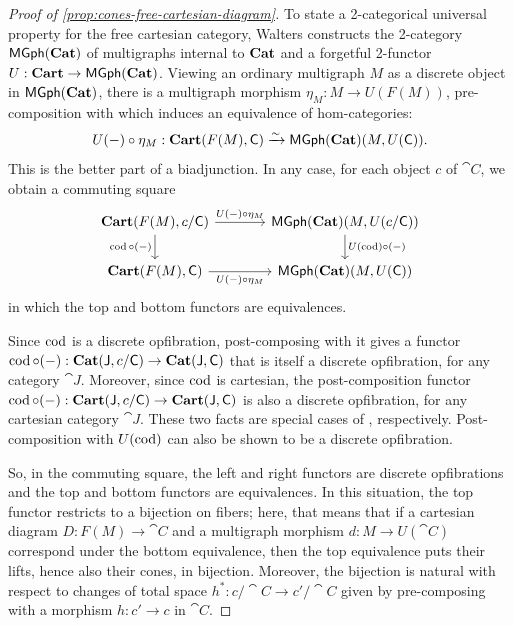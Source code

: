 \documentclass[11pt]{article}
\numberwithin{equation}{section}
\begin{document}
\begin{proof}[Proof of \cref{prop:cones-free-cartesian-diagram}]
  To state a 2-categorical universal property for the free cartesian category,
  Walters \cite{walters1989} constructs the 2-category $\mathsf{MGph}(\mathbf{Cat})$ of
  multigraphs internal to $\mathbf{Cat}$ and a forgetful 2-functor
  $U: \mathbf{Cart} \to \mathsf{MGph}(\mathbf{Cat})$. Viewing an ordinary multigraph $M$ as a discrete
  object in $\mathsf{MGph}(\mathbf{Cat})$, there is a multigraph morphism $\eta_M: M \to U(F(M))$,
  pre-composition with which induces an equivalence of hom-categories:
  \begin{equation*}
    U(-) \circ \eta_M: \mathbf{Cart}(F(M), \mathsf{C})
      \xrightarrow{\sim} \mathsf{MGph}(\mathbf{Cat})(M, U(\mathsf{C})).
  \end{equation*}
  This is the better part of a biadjunction. In any case, for each object $c$ of
  $\cat{C}$, we obtain a commuting square
  \begin{equation*}
    \begin{tikzcd}[column sep=large]
      {\Cart(F(M),c/\cat{C})} & {\MGraph(\Cat)(M, U(c/\cat{C}))} \\
      {\Cart(F(M),\cat{C})} & {\MGraph(\Cat)(M, U(\cat{C}))}
      \arrow["{U(-) \circ \eta_M}", from=1-1, to=1-2]
      \arrow["{\cod \circ (-)}"', from=1-1, to=2-1]
      \arrow["{U(\cod) \circ (-)}", from=1-2, to=2-2]
      \arrow["{U(-) \circ \eta_M}"', from=2-1, to=2-2]
    \end{tikzcd}
  \end{equation*}
  in which the top and bottom functors are equivalences.

  Since $\operatorname{cod}$ is a discrete opfibration, post-composing with it gives a functor
  $\operatorname{cod} \circ (-): \mathbf{Cat}(\mathsf{J}, c/\mathsf{C}) \to \mathbf{Cat}(\mathsf{J}, \mathsf{C})$ that is itself
  a discrete opfibration, for any category $\cat{J}$. Moreover, since $\operatorname{cod}$ is
  cartesian, the post-composition functor
  $\operatorname{cod} \circ (-): \mathbf{Cart}(\mathsf{J}, c/\mathsf{C}) \to \mathbf{Cart}(\mathsf{J}, \mathsf{C})$ is also a
  discrete opfibration, for any cartesian category $\cat{J}$. These two facts
  are special cases of \cite[Theorems 5.2 and 6.6]{patterson2023}, respectively.
  Post-composition with $U(\operatorname{cod})$ can also be shown to be a discrete
  opfibration.

  So, in the commuting square, the left and right functors are discrete
  opfibrations and the top and bottom functors are equivalences. In this
  situation, the top functor restricts to a bijection on fibers; here, that
  means that if a cartesian diagram $D: F(M) \to \cat{C}$ and a multigraph
  morphism $d: M \to U(\cat{C})$ correspond under the bottom equivalence, then the
  top equivalence puts their lifts, hence also their cones, in bijection.
  Moreover, the bijection is natural with respect to changes of total space
  $h^*: c/\cat{C} \to c'/\cat{C}$ given by pre-composing with a morphism
  $h: c' \to c$ in $\cat{C}$.
\end{proof}
\end{document}
